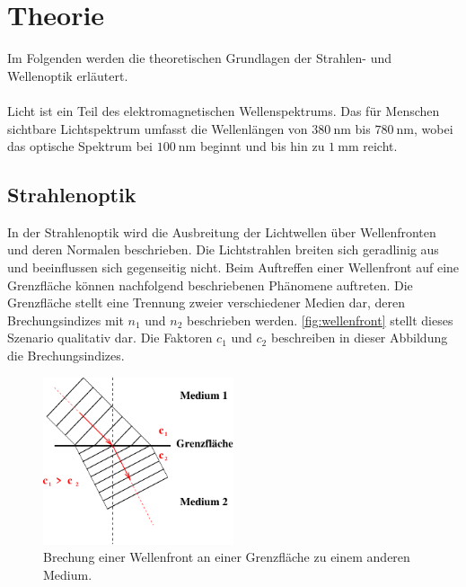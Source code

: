 \section{Theorie}

    Im Folgenden werden die theoretischen Grundlagen der Strahlen- und Wellenoptik erläutert.\\
    \\
    Licht ist ein Teil des elektromagnetischen Wellenspektrums.
    Das für Menschen sichtbare Lichtspektrum umfasst die Wellenlängen
    von $\SI{380}{\nano\meter}$ bis $\SI{780}{\nano\meter}$,
    wobei das optische Spektrum bei $\SI{100}{\nano\meter}$ beginnt
    und bis hin zu $\SI{1}{\milli\meter}$ reicht.

\subsection{Strahlenoptik}

    In der Strahlenoptik wird die Ausbreitung der Lichtwellen über Wellenfronten und deren Normalen beschrieben.
    Die Lichtstrahlen breiten sich geradlinig aus und beeinflussen sich gegenseitig nicht.
    Beim Auftreffen einer Wellenfront auf eine Grenzfläche können nachfolgend beschriebenen Phänomene auftreten.
    Die Grenzfläche stellt eine Trennung zweier verschiedener Medien dar,
    deren Brechungsindizes mit $n_1$ und $n_2$ beschrieben werden.
    \autoref{fig:wellenfront} stellt dieses Szenario qualitativ dar.
    Die Faktoren $c_1$ und $c_2$ beschreiben in dieser Abbildung die Brechungsindizes.
    \begin{figure}[H]
        \centering
        \includegraphics[width=0.5\textwidth]{content/img/Abb_1.pdf}
        \caption{Brechung einer Wellenfront an einer Grenzfläche zu einem anderen Medium. \cite{versuchsanleitung}}
        \label{fig:wellenfront}
    \end{figure}


